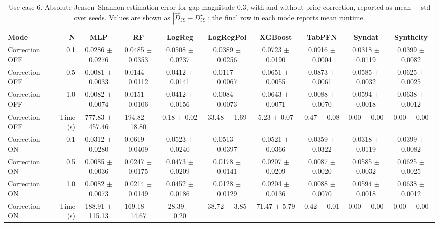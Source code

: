 \begin{table}[ht]
\centering
\scriptsize
\setlength{\tabcolsep}{2.5pt}
\caption{Use case 6. Absolute Jensen--Shannon estimation error for gap magnitude $0.3$, with and without prior correction, reported as mean $\pm$ std over seeds. Values are shown as $|\widehat{D}_{\mathrm{JS}} - D_{\mathrm{JS}}^{\star}|$; the final row in each mode reports mean runtime.}
\label{tab:uc6_gap_0p3_on_off_mean_std_from_seeds}
\begin{tabular}{lrcccccccc}
\toprule
Mode & N & MLP & RF & LogReg & LogRegPol & XGBoost & TabPFN & Syndat & Synthcity \\
\midrule
Correction OFF & 0.1 & 0.0286 $\pm$ 0.0276 & 0.0485 $\pm$ 0.0353 & 0.0508 $\pm$ 0.0237 & 0.0389 $\pm$ 0.0256 & 0.0723 $\pm$ 0.0190 & 0.0916 $\pm$ 0.0004 & 0.0318 $\pm$ 0.0119 & 0.0399 $\pm$ 0.0082 \\
Correction OFF & 0.5 & 0.0081 $\pm$ 0.0033 & 0.0144 $\pm$ 0.0112 & 0.0412 $\pm$ 0.0141 & 0.0117 $\pm$ 0.0067 & 0.0651 $\pm$ 0.0055 & 0.0873 $\pm$ 0.0061 & 0.0585 $\pm$ 0.0032 & 0.0625 $\pm$ 0.0025 \\
Correction OFF & 1.0 & 0.0082 $\pm$ 0.0074 & 0.0151 $\pm$ 0.0106 & 0.0412 $\pm$ 0.0156 & 0.0084 $\pm$ 0.0073 & 0.0643 $\pm$ 0.0071 & 0.0088 $\pm$ 0.0070 & 0.0594 $\pm$ 0.0018 & 0.0638 $\pm$ 0.0012 \\
Correction OFF & Time (s) & 777.83 $\pm$ 457.46 & 194.82 $\pm$ 18.80 & 0.18 $\pm$ 0.02 & 33.48 $\pm$ 1.69 & 5.23 $\pm$ 0.07 & 0.47 $\pm$ 0.08 & 0.00 $\pm$ 0.00 & 0.00 $\pm$ 0.00 \\
Correction ON & 0.1 & 0.0312 $\pm$ 0.0280 & 0.0619 $\pm$ 0.0409 & 0.0523 $\pm$ 0.0240 & 0.0513 $\pm$ 0.0397 & 0.0521 $\pm$ 0.0366 & 0.0359 $\pm$ 0.0322 & 0.0318 $\pm$ 0.0119 & 0.0399 $\pm$ 0.0082 \\
Correction ON & 0.5 & 0.0085 $\pm$ 0.0036 & 0.0247 $\pm$ 0.0175 & 0.0473 $\pm$ 0.0209 & 0.0178 $\pm$ 0.0141 & 0.0207 $\pm$ 0.0209 & 0.0087 $\pm$ 0.0020 & 0.0585 $\pm$ 0.0032 & 0.0625 $\pm$ 0.0025 \\
Correction ON & 1.0 & 0.0082 $\pm$ 0.0073 & 0.0214 $\pm$ 0.0149 & 0.0452 $\pm$ 0.0186 & 0.0128 $\pm$ 0.0129 & 0.0204 $\pm$ 0.0136 & 0.0088 $\pm$ 0.0070 & 0.0594 $\pm$ 0.0018 & 0.0638 $\pm$ 0.0012 \\
Correction ON & Time (s) & 188.91 $\pm$ 115.13 & 169.18 $\pm$ 14.67 & 28.39 $\pm$ 0.20 & 38.72 $\pm$ 3.85 & 71.47 $\pm$ 5.79 & 0.42 $\pm$ 0.01 & 0.00 $\pm$ 0.00 & 0.00 $\pm$ 0.00 \\
\bottomrule
\end{tabular}
\end{table}